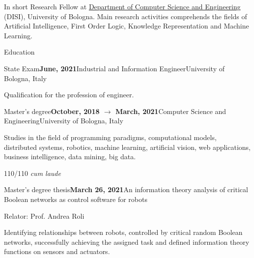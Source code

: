 \documentclass{resume} %
\begin{document}
    
    \begin{rSection}{In short}
        Research Fellow at \href{https://disi.unibo.it/it}{Department of Computer Science and Engineering} (DISI), University of Bologna.
        Main research activities comprehends the fields of Artificial Intelligence, First Order Logic, Knowledge Representation and Machine Learning.
        
    \end{rSection}
    
    
    \begin{rSection}{Education}
        
        \begin{rSubsection}{State Exam}{\textbf{June, 2021}}{Industrial and Information Engineer}{University of Bologna, Italy}
            \item Qualification for the profession of engineer.
        \end{rSubsection}
        
        \begin{rSubsection}{Master's degree}{\textbf{October, 2018 $\rightarrow$ March, 2021}}{Computer Science and Engineering}{University of Bologna, Italy}
            \item Studies in the field of programming paradigms, computational models, distributed systems, robotics, machine learning, artificial vision, web applications, business intelligence, data mining, big data.
            
            \item 110/110 \emph{cum laude}
        \end{rSubsection}
        \begin{rSubsection}{Master's degree thesis}{\textbf{March 26, 2021}}{An information theory analysis of critical Boolean networks as control software for robots}{\begin{flushright}
                    Relator: Prof. Andrea Roli
            \end{flushright}}
            \item Identifying relationships between robots, controlled by critical random Boolean networks, successfully achieving the assigned task and defined information theory functions on sensors and actuators.
            

\end{rSubsection}
\end{rSection}
\end{document}
